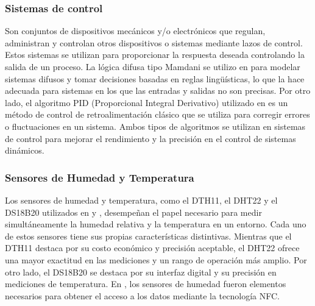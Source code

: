 \subsubsection*{Sistemas de control}
Son conjuntos de dispositivos mecánicos y/o electrónicos que regulan, administran y controlan otros dispositivos o sistemas mediante lazos de control. Estos sistemas se utilizan para proporcionar la respuesta deseada controlando la salida de un proceso. La lógica difusa tipo Mamdani se utilizo en \cite{mohammed_intelligent_nodate} \cite{widyawati_fuzzy_2022} para modelar sistemas difusos y tomar decisiones basadas en reglas lingüísticas, lo que la hace adecuada para sistemas en los que las entradas y salidas no son precisas. Por otro lado, el algoritmo PID (Proporcional Integral Derivativo) utilizado en \cite{haiyan_intelligent_2022} es un método de control de retroalimentación clásico que se utiliza para corregir errores o fluctuaciones en un sistema. Ambos tipos de algoritmos se utilizan en sistemas de control para mejorar el rendimiento y la precisión en el control de sistemas dinámicos.

\subsubsection*{Sensores de Humedad y Temperatura}
Los sensores de humedad y temperatura, como el DTH11, el DHT22 y el DS18B20 utilizados en \cite{lema_holguin_implementacion_2018} \cite{alcivar_dominguez_sistema_2018} \cite{munir_intelligent_2019} \cite{krishnan_fuzzy_2020} \cite{benyezza_zoning_2021} \cite{widyawati_fuzzy_2022} y \cite{noauthor_fuzzy_2023}, desempeñan el papel necesario para medir simultáneamente la humedad relativa y la temperatura en un entorno. Cada uno de estos sensores tiene sus propias características distintivas. Mientras que el DTH11 destaca por su costo económico y precisión aceptable, el DHT22 ofrece una mayor exactitud en las mediciones y un rango de operación más amplio. Por otro lado, el DS18B20 se destaca por su interfaz digital y su precisión en mediciones de temperatura. En \cite{castillo_herrero_desarrollo_2020}, los sensores de humedad fueron elementos necesarios para obtener el acceso a los datos mediante la tecnología NFC.

